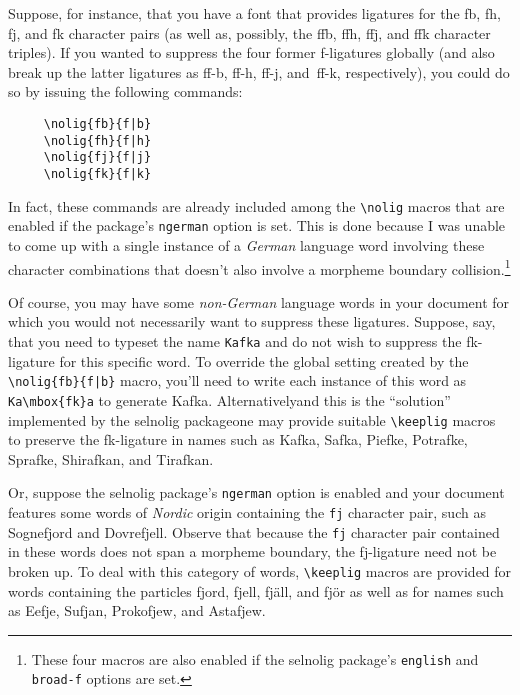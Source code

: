 \documentclass[12pt]{article}
\newcommand{\pkg}[1]{\textsf{#1}}
\newcommand{\opt}[1]{\texttt{#1}}
\newcommand{\cmmd}[1]{\texttt{\textbackslash #1}}
\begin{document}
Suppose, for instance, that you have a font that provides ligatures for the \mbox{fb}, \mbox{fh}, \mbox{fj}, and \mbox{fk} character pairs (as well as, possibly, the \mbox{ffb}, \mbox{ffh}, \mbox{ffj}, and \mbox{ffk} character triples). If you wanted to suppress the four former f-ligatures globally (and also break up the latter ligatures as ff-b, ff-h, ff-j, and~ff-k, respectively), you could do so by issuing the following commands: \egroup
\begin{Verbatim}
     \nolig{fb}{f|b}
     \nolig{fh}{f|h}
     \nolig{fj}{f|j}
     \nolig{fk}{f|k}
\end{Verbatim}
In fact, these commands are already included among the \cmmd{nolig} macros that are enabled if the package's \opt{ngerman} option is set. This is done because I was unable to come up with a single instance of a \emph{German} language word involving these character combinations that doesn't also involve a morpheme boundary collision.\footnote{These four macros are also enabled if the \pkg{selnolig} package's \opt{english} and \opt{broad-f} options are set.}


Of course, you may have some \emph{non-German} language words in your document for which you would not necessarily want to suppress these ligatures. \bgroup \ebg Suppose, say, that you need to typeset the name \opt{Kafka} and do not wish to suppress the \mbox{fk}-ligature for this specific word. To override the global setting created by the \Verb+\nolig{fb}{f|b}+ macro, you'll need to write each instance of this word as 
\Verb+Ka\mbox{fk}a+
to generate Ka\mbox{fk}a. Alternatively\textemdash and this is the \enquote{solution} implemented by the \pkg{selnolig} package\textemdash one may provide suitable \cmmd{keeplig} macros to preserve the \mbox{fk}-ligature in names such as Kafka, Safka, Piefke, Potrafke, Sprafke, Shirafkan, and Tirafkan. \egroup



Or, suppose the \pkg{selnolig} package's \opt{ngerman} option is enabled and your document features some words of \emph{Nordic} origin containing the \opt{fj} character pair, such as Sogne\-\mbox{fj}ord and Dovre\-\mbox{fj}ell. Observe that because the \opt{fj} character pair contained in these words does not span a morpheme boundary, the \mbox{fj}-ligature need not be broken up. To deal with this category of words, \cmmd{keeplig} macros are provided for words containing the particles fjord, fjell, fjäll, and fjör as well as for names such as Eefje, Sufjan, Prokofjew, and Astafjew.
\end{document}
